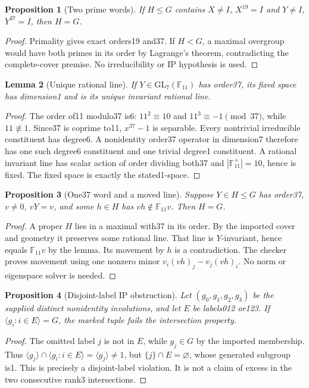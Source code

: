 \documentclass[11pt]{article}
\newtheorem{lemma}{Lemma}
\newtheorem{proposition}[lemma]{Proposition}
\newcommand{\F}{\mathbb F}
\newcommand{\gen}[1]{\langle #1\rangle}
\begin{document}
\begin{proposition}[Two prime words]
If $H\leq G$ contains $X\ne I$, $X^{19}=I$ and $Y\ne I$, $Y^{37}=I$,
then $H=G$.
\end{proposition}
\begin{proof}
Primality gives exact orders19 and37. If $H<G$, a maximal overgroup
would have both primes in its order by Lagrange's theorem, contradicting
the complete-cover premise. No irreducibility or IP hypothesis is used.
\end{proof}

\begin{lemma}[Unique rational line]
If $Y\in\mathrm{GL}_7(\F_{11})$ has order37, its fixed space has
dimension1 and is its unique invariant rational line.
\end{lemma}
\begin{proof}
The order of11 modulo37 is6: $11^2\equiv10$ and
$11^3\equiv-1\pmod{37}$, while $11\not\equiv1$.
Since37 is coprime to11, $x^{37}-1$ is separable. Every nontrivial
irreducible constituent has degree6. A nonidentity order37 operator
in dimension7 therefore has one such degree6 constituent and one
trivial degree1 constituent. A rational invariant line has scalar
action of order dividing both37 and $|\F_{11}^{\times}|=10$, hence is
fixed. The fixed space is exactly the stated1-space.
\end{proof}

\begin{proposition}[One37 word and a moved line]
Suppose $Y\in H\leq G$ has order37, $v\ne0$, $vY=v$, and some
$h\in H$ has $vh\notin\F_{11}v$. Then $H=G$.
\end{proposition}
\begin{proof}
A proper $H$ lies in a maximal with37 in its order. By the imported
cover and geometry it preserves some rational line. That line is
$Y$-invariant, hence equals $\F_{11}v$ by the lemma. Its movement by
$h$ is a contradiction. The checker proves movement using one nonzero
minor $v_i(vh)_j-v_j(vh)_i$. No norm or eigenspace solver is needed.
\end{proof}

\begin{proposition}[Disjoint-label IP obstruction]
Let $(g_0,g_1,g_2,g_3)$ be the supplied distinct nonidentity involutions,
and let $E$ be labels012 or123. If $\gen{g_i:i\in E}=G$, the marked
tuple fails the intersection property.
\end{proposition}
\begin{proof}
The omitted label $j$ is not in $E$, while $g_j\in G$ by the imported
membership. Thus $\gen{g_j}\cap\gen{g_i:i\in E}=\gen{g_j}\ne1$,
but $\{j\}\cap E=\varnothing$, whose generated subgroup is1.
This is precisely a disjoint-label violation. It is not a claim of
excess in the two consecutive rank3 intersections.
\end{proof}
\end{document}

